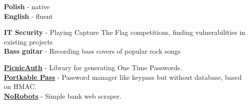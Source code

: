 \documentclass[9pt]{developercv} %
\begin{document}
\begin{minipage}[t]{0.2\textwidth}
	\vspace{-\baselineskip} %


	\textbf{Polish} - native\\
	\textbf{English} - fluent\\
\end{minipage}
\hfill
\begin{minipage}[t]{0.3\textwidth}
	\vspace{-\baselineskip} %


	\textbf{IT Security} - Playing Capture The Flag competitions, finding vulnerabilities in existing projects\\
	\textbf{Bass guitar} - Recording bass covers of popular rock songs
\end{minipage}
\hfill
\begin{minipage}[t]{0.4\textwidth}
	\vspace{-\baselineskip} %


	\textbf{\href{https://github.com/matishadow/PicnicAuth}{PicnicAuth}} - Library for generating One Time Passwords.\\
	\textbf{\href{https://github.com/matishadow/portkable-pass}{Portkable Pass}} - Password manager like keypass but without database, based on HMAC.\\
	\textbf{\href{https://github.com/matishadow/NoRobots}{NoRobots}} - Simple bank web scraper.
\end{minipage}

\end{document}
